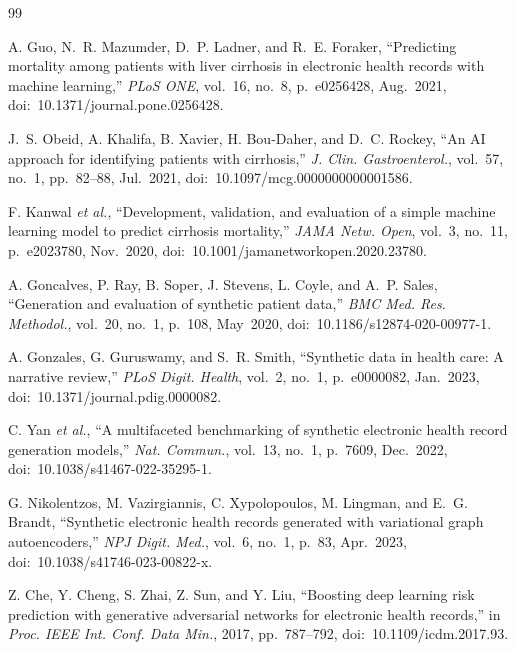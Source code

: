 \documentclass[journal]{IEEEtran}
\begin{document}
\begin{thebibliography}{99}

A. Guo, N.~R. Mazumder, D.~P. Ladner, and R.~E. Foraker, ``Predicting mortality among patients with liver cirrhosis in electronic health records with machine learning,'' \textit{PLoS ONE}, vol.~16, no.~8, p.~e0256428, Aug.~2021, doi:~10.1371/journal.pone.0256428.

J.~S. Obeid, A. Khalifa, B. Xavier, H. Bou-Daher, and D.~C. Rockey, ``An AI approach for identifying patients with cirrhosis,'' \textit{J. Clin. Gastroenterol.}, vol.~57, no.~1, pp.~82--88, Jul.~2021, doi:~10.1097/mcg.0000000000001586.

F. Kanwal \textit{et al.}, ``Development, validation, and evaluation of a simple machine learning model to predict cirrhosis mortality,'' \textit{JAMA Netw. Open}, vol.~3, no.~11, p.~e2023780, Nov.~2020, doi:~10.1001/jamanetworkopen.2020.23780.

A. Goncalves, P. Ray, B. Soper, J. Stevens, L. Coyle, and A.~P. Sales, ``Generation and evaluation of synthetic patient data,'' \textit{BMC Med. Res. Methodol.}, vol.~20, no.~1, p.~108, May~2020, doi:~10.1186/s12874-020-00977-1.

A. Gonzales, G. Guruswamy, and S.~R. Smith, ``Synthetic data in health care: A narrative review,'' \textit{PLoS Digit. Health}, vol.~2, no.~1, p.~e0000082, Jan.~2023, doi:~10.1371/journal.pdig.0000082.

C. Yan \textit{et al.}, ``A multifaceted benchmarking of synthetic electronic health record generation models,'' \textit{Nat. Commun.}, vol.~13, no.~1, p.~7609, Dec.~2022, doi:~10.1038/s41467-022-35295-1.

G. Nikolentzos, M. Vazirgiannis, C. Xypolopoulos, M. Lingman, and E.~G. Brandt, ``Synthetic electronic health records generated with variational graph autoencoders,'' \textit{NPJ Digit. Med.}, vol.~6, no.~1, p.~83, Apr.~2023, doi:~10.1038/s41746-023-00822-x.

Z. Che, Y. Cheng, S. Zhai, Z. Sun, and Y. Liu, ``Boosting deep learning risk prediction with generative adversarial networks for electronic health records,'' in \textit{Proc. IEEE Int. Conf. Data Min.}, 2017, pp.~787--792, doi:~10.1109/icdm.2017.93.


\end{thebibliography}
\end{document}

